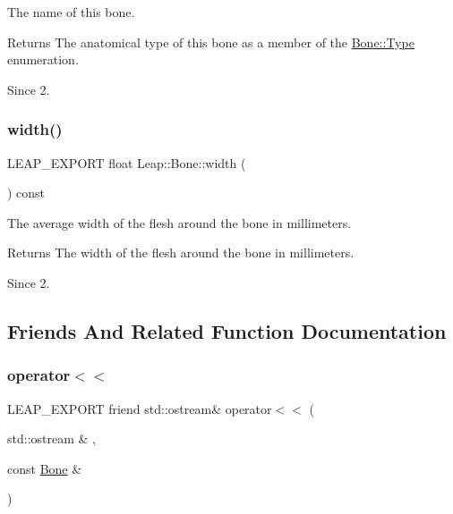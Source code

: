 The name of this bone.


\begin{DoxyCodeInclude}
\end{DoxyCodeInclude}


\begin{DoxyReturn}{Returns}
The anatomical type of this bone as a member of the \hyperlink{class_leap_1_1_bone_ac2f949e05b22edc21a308df42580b5e1}{Bone\+::\+Type} enumeration. 
\end{DoxyReturn}
\begin{DoxySince}{Since}
2. 
\end{DoxySince}
\mbox{\label{class_leap_1_1_bone_a6275e4d9e6cbca6871a5dc21273ab329}} 
\subsubsection{\texorpdfstring{width()}{width()}}
{\footnotesize\ttfamily L\+E\+A\+P\+\_\+\+E\+X\+P\+O\+RT float Leap\+::\+Bone\+::width (\begin{DoxyParamCaption}{ }\end{DoxyParamCaption}) const}

The average width of the flesh around the bone in millimeters.


\begin{DoxyCodeInclude}
\end{DoxyCodeInclude}


\begin{DoxyReturn}{Returns}
The width of the flesh around the bone in millimeters. 
\end{DoxyReturn}
\begin{DoxySince}{Since}
2. 
\end{DoxySince}


\subsection{Friends And Related Function Documentation}
\mbox{\label{class_leap_1_1_bone_a432facbe3496dc0ec64ce42c840eacd6}} 
\subsubsection{\texorpdfstring{operator$<$$<$}{operator<<}}
{\footnotesize\ttfamily L\+E\+A\+P\+\_\+\+E\+X\+P\+O\+RT friend std\+::ostream\& operator$<$$<$ (\begin{DoxyParamCaption}\item[{std\+::ostream \&}]{,  }\item[{const \hyperlink{class_leap_1_1_bone}{Bone} \&}]{ }\end{DoxyParamCaption})\hspace{0.3cm}{\ttfamily [friend]}}

